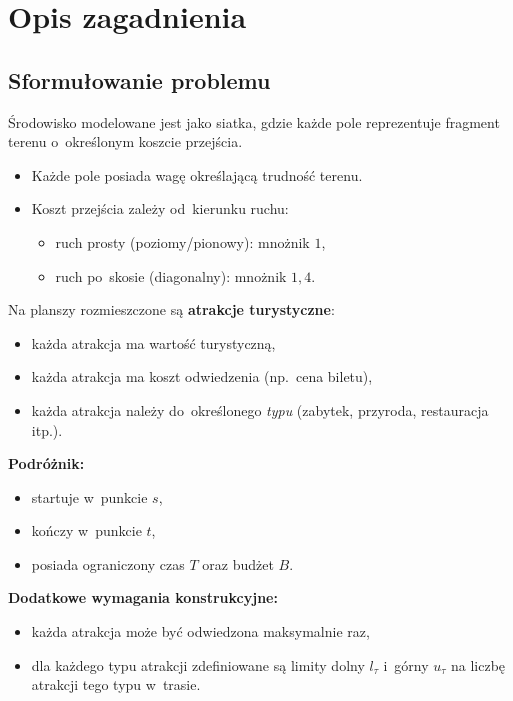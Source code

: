 \section{Opis zagadnienia}
\label{sec:zagadnienie}

\subsection{Sformułowanie problemu}
\label{sec:problem}

Środowisko modelowane jest jako siatka, gdzie każde pole reprezentuje
fragment terenu o~określonym koszcie przejścia.

\begin{itemize}
    \item Każde pole posiada wagę określającą trudność terenu.
    \item Koszt przejścia zależy od~kierunku ruchu:
    \begin{itemize}
        \item ruch prosty (poziomy/pionowy): mnożnik $1$,
        \item ruch po~skosie (diagonalny): mnożnik $1{,}4$.
    \end{itemize}
\end{itemize}

Na planszy rozmieszczone są \textbf{atrakcje turystyczne}:
\begin{itemize}
    \item każda atrakcja ma wartość turystyczną,
    \item każda atrakcja ma koszt odwiedzenia (np.\ cena biletu),
    \item każda atrakcja należy do~określonego \emph{typu} (zabytek,
          przyroda, restauracja itp.).
\end{itemize}

\textbf{Podróżnik:}
\begin{itemize}
    \item startuje w~punkcie $s$,
    \item kończy w~punkcie $t$,
    \item posiada ograniczony czas $T$ oraz budżet $B$.
\end{itemize}

\textbf{Dodatkowe wymagania konstrukcyjne:}
\begin{itemize}
    \item każda atrakcja może być odwiedzona maksymalnie raz,
    \item dla każdego typu atrakcji zdefiniowane są limity dolny $l_{\tau}$
          i~górny $u_{\tau}$ na liczbę atrakcji tego typu w~trasie.
\end{itemize}

